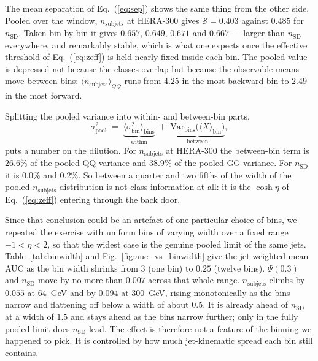 \documentclass[reprint,amsmath,amssymb,aps,prd,floatfix]{revtex4-2}
\begin{document}
The mean separation of Eq.~(\ref{eq:sep}) shows the same thing from the other
side. Pooled over the window, $n_{\mathrm{subjets}}$ at HERA-300 gives
$\mathcal{S} = 0.403$ against $0.485$ for $n_{\mathrm{SD}}$. Taken bin by bin it
gives $0.657$, $0.649$, $0.671$ and $0.667$ --- larger than $n_{\mathrm{SD}}$
everywhere, and remarkably stable, which is what one expects once the effective
threshold of Eq.~(\ref{eq:zeff}) is held nearly fixed inside each bin. The
pooled value is depressed not because the classes overlap but because the
observable means move between bins: $\langle n_{\mathrm{subjets}}\rangle_{QQ}$
runs from $4.25$ in the most backward bin to $2.49$ in the most forward.

Splitting the pooled variance into within- and between-bin parts,
\begin{equation}
\sigma^2_{\mathrm{pool}} \;=\;
\underbrace{\bigl\langle \sigma^2_{\mathrm{bin}} \bigr\rangle_{\mathrm{bins}}}_{\text{within}}
\;+\;
\underbrace{\mathrm{Var}_{\mathrm{bins}}\bigl(\langle X\rangle_{\mathrm{bin}}\bigr)}_{\text{between}},
\label{eq:vardecomp}
\end{equation}
puts a number on the dilution. For $n_{\mathrm{subjets}}$ at HERA-300 the
between-bin term is $26.6\%$ of the pooled QQ variance and $38.9\%$ of the
pooled GG variance. For $n_{\mathrm{SD}}$ it is $0.0\%$ and $0.2\%$. So between
a quarter and two fifths of the width of the pooled $n_{\mathrm{subjets}}$
distribution is not class information at all: it is the $\cosh\eta$ of
Eq.~(\ref{eq:zeff}) entering through the back door.

Since that conclusion could be an artefact of one particular choice of bins, we
repeated the exercise with uniform bins of varying width over a fixed range
$-1 < \eta < 2$, so that the widest case is the genuine pooled limit of the same
jets. Table~\ref{tab:binwidth} and Fig.~\ref{fig:auc_vs_binwidth} give the
jet-weighted mean AUC as the bin width shrinks from $3$ (one bin) to $0.25$
(twelve bins). $\Psi(0.3)$ and $n_{\mathrm{SD}}$ move by no more than $0.007$
across that whole range. $n_{\mathrm{subjets}}$ climbs by $0.055$ at 64~GeV and
by $0.094$ at 300~GeV, rising monotonically as the bins narrow and flattening off
below a width of about $0.5$. It is already ahead of $n_{\mathrm{SD}}$ at a width
of $1.5$ and stays ahead as the bins narrow further; only in the fully pooled
limit does $n_{\mathrm{SD}}$ lead. The effect is therefore not a feature of the
binning we happened to pick. It is controlled by how much jet-kinematic spread
each bin still contains.
\end{document}
